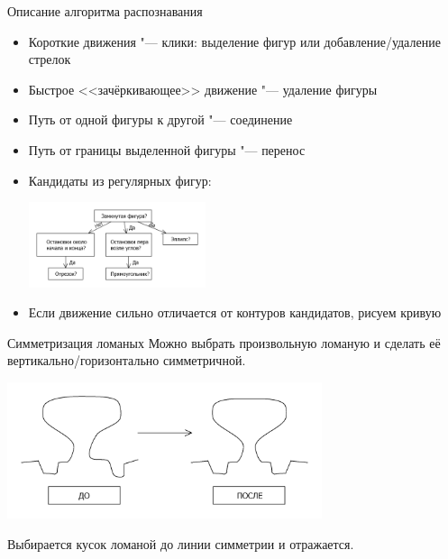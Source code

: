 \documentclass[utf8,xcolor=table]{beamer}
\begin{document}
\begin{frame}[t]{Описание алгоритма распознавания}
  \begin{itemize}
  \item Короткие движения "--- клики: выделение фигур или добавление/удаление стрелок
  \item Быстрое <<зачёркивающее>> движение "--- удаление фигуры
  \item Путь от одной фигуры к другой "--- соединение
  \item Путь от границы выделенной фигуры "--- перенос
  \item Кандидаты из регулярных фигур:
    \begin{center}
      \includegraphics[height=2.5cm]{algo_cand}
    \end{center}
  \item Если движение сильно отличается от контуров кандидатов, рисуем кривую
  \end{itemize}
\end{frame}

\begin{frame}[t]{Симметризация ломаных}
  Можно выбрать произвольную ломаную и сделать её вертикально/горизонтально симметричной.
  \begin{center}
    \includegraphics[height=4cm]{demo_symm}
  \end{center}
  Выбирается кусок ломаной до линии симметрии и отражается.
\end{frame}
\end{document}
